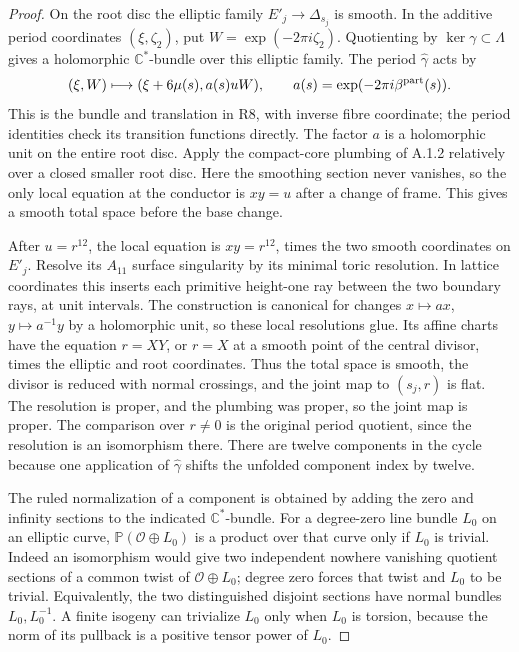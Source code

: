 \begin{proof}
On the root disc the elliptic family $E'_j\to\Delta_{s_j}$ is
smooth. In the additive period coordinates $(\xi,\zeta_2)$,
put $W=\exp(-2\pi i\zeta_2)$. Quotienting by
$\ker\gamma\subset\Lambda$ gives a holomorphic
$\mathbb C^*$-bundle over this elliptic family. The period
$\widehat\gamma$ acts by
\[
 (\xi,W)\longmapsto
 (\xi+6\mu(s),a(s)uW),\qquad
 a(s)=\exp(-2\pi i\beta^{\rm part}(s)).
\]
This is the bundle and translation in R8, with inverse fibre
coordinate; the period identities check its transition
functions directly. The factor $a$ is a holomorphic unit on
the entire root disc. Apply the compact-core plumbing of
A.1.2 relatively over a closed smaller root disc. Here the
smoothing section never vanishes, so the only local equation
at the conductor is $xy=u$ after a change of frame. This
gives a smooth total space before the base change.

After $u=r^{12}$, the local equation is $xy=r^{12}$,
times the two smooth coordinates on $E'_j$. Resolve its
$A_{11}$ surface singularity by its minimal toric resolution.
In lattice coordinates this inserts each primitive height-one
ray between the two boundary rays, at unit intervals. The
construction is canonical for changes $x\mapsto a x$,
$y\mapsto a^{-1}y$ by a holomorphic unit, so these local
resolutions glue. Its affine charts have the equation
$r=XY$, or $r=X$ at a smooth point of the central divisor,
times the elliptic and root coordinates. Thus the total space
is smooth, the divisor is reduced with normal crossings, and
the joint map to $(s_j,r)$ is flat. The resolution is proper,
and the plumbing was proper, so the joint map is proper.
The comparison over $r\ne0$ is the original period quotient,
since the resolution is an isomorphism there. There are
twelve components in the cycle because one application of
$\widehat\gamma$ shifts the unfolded component index by
twelve.

The ruled normalization of a component is obtained by adding
the zero and infinity sections to the indicated
$\mathbb C^*$-bundle. For a degree-zero line bundle $L_0$
on an elliptic curve, $\mathbb P(\mathcal O\oplus L_0)$
is a product over that curve only if $L_0$ is trivial.
Indeed an isomorphism would give two independent nowhere
vanishing quotient sections of a common twist of
$\mathcal O\oplus L_0$; degree zero forces that twist and
$L_0$ to be trivial. Equivalently, the two distinguished
disjoint sections have normal bundles $L_0,L_0^{-1}$.
A finite isogeny can trivialize $L_0$ only when $L_0$ is
torsion, because the norm of its pullback is a positive
tensor power of $L_0$.


\end{proof}
